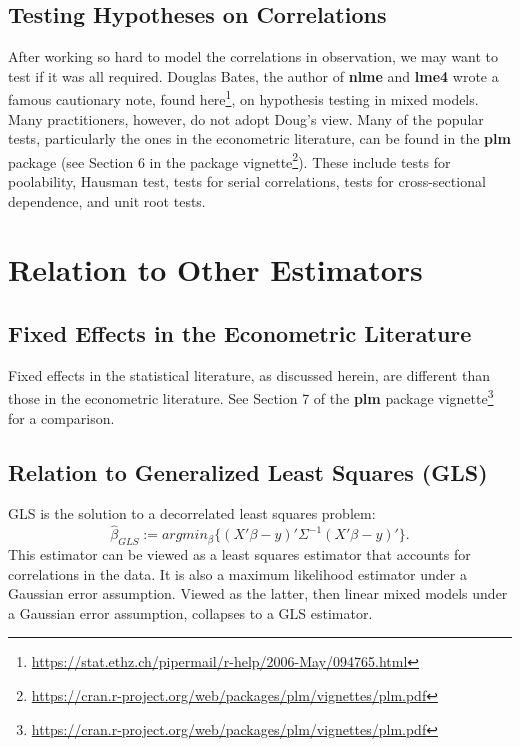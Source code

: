 \documentclass[]{book}
\renewcommand{\href}[2]{#2\footnote{\url{#1}}}
\theoremstyle{definition}
\theoremstyle{definition}
\theoremstyle{definition}
\theoremstyle{remark}
\begin{document}
\hypertarget{testing-hypotheses-on-correlations}{%
\subsection{Testing Hypotheses on Correlations}\label{testing-hypotheses-on-correlations}}

After working so hard to model the correlations in observation, we may want to test if it was all required.
Douglas Bates, the author of \textbf{nlme} and \textbf{lme4} wrote a famous cautionary note, \href{https://stat.ethz.ch/pipermail/r-help/2006-May/094765.html}{found here}, on hypothesis testing in mixed models.
Many practitioners, however, do not adopt Doug's view.
Many of the popular tests, particularly the ones in the econometric literature, can be found in the \textbf{plm} package (see Section 6 in the \href{https://cran.r-project.org/web/packages/plm/vignettes/plm.pdf}{package vignette}).
These include tests for poolability, Hausman test, tests for serial correlations, tests for cross-sectional dependence, and unit root tests.

\hypertarget{relation-to-other-estimators}{%
\section{Relation to Other Estimators}\label{relation-to-other-estimators}}

\hypertarget{fixed-effects-in-the-econometric-literature}{%
\subsection{Fixed Effects in the Econometric Literature}\label{fixed-effects-in-the-econometric-literature}}

Fixed effects in the statistical literature, as discussed herein, are different than those in the econometric literature.
See Section 7 of the \textbf{plm} \href{https://cran.r-project.org/web/packages/plm/vignettes/plm.pdf}{package vignette} for a comparison.

\hypertarget{relation-to-generalized-least-squares-gls}{%
\subsection{Relation to Generalized Least Squares (GLS)}\label{relation-to-generalized-least-squares-gls}}

GLS is the solution to a decorrelated least squares problem:
\[\hat{\beta}_{GLS}:=argmin_\beta\{(X'\beta-y)'\Sigma^{-1}(X'\beta-y)'\}.\]
This estimator can be viewed as a least squares estimator that accounts for correlations in the data.
It is also a maximum likelihood estimator under a Gaussian error assumption.
Viewed as the latter, then linear mixed models under a Gaussian error assumption, collapses to a GLS estimator.
\end{document}
